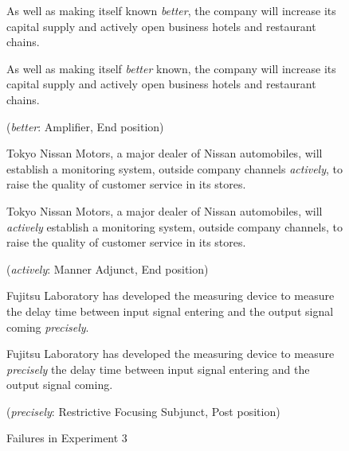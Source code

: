 \begin{singlespace}
\begin{figure}[htbp]
    \leavevmode
\begin{description}
 \small
 \item[This Method\ \ \ \ \ \ \ ]
As well as making itself known {\em better}, the company will increase 
its capital supply and actively open business hotels and restaurant chains. 
 \item[Human Translation]
As well as making itself {\em better} known, the company will increase 
its capital supply and actively open business hotels and restaurant chains. 
 \item[] ({\em better}: Amplifier, End position) 
\vspace*{2mm}
\end{description} 
\begin{description}
 \small
 \item[This Method\ \ \ \ \ \ \ ]
Tokyo Nissan Motors, a major dealer of Nissan automobiles, will  
establish a monitoring system, outside company channels {\em actively}, 
to raise the quality of customer service in its stores. 
 \item[Human Translation]
Tokyo Nissan Motors, a major dealer of Nissan automobiles, will 
{\em actively} establish a monitoring system, outside company channels, 
to raise the quality of customer service in its stores. 
 \item [] ({\em actively}:  Manner Adjunct, End position)
\vspace*{1mm}
\end{description} 
\begin{description}
 \small
 \item [This Method\ \ \ \ \ \ \ ]
Fujitsu Laboratory has developed the measuring device to measure 
the delay time between input signal entering and 
the output signal coming {\em precisely}. 
 \item [Human Translation]
Fujitsu Laboratory has developed the measuring device to measure 
{\em precisely} the delay time between input signal entering and 
the output signal coming.
 \item [] ({\em precisely}: Restrictive Focusing Subjunct, Post position)
\vspace*{2mm}
\end{description} 
    \caption{Failures in Experiment 3}
    \label{fig:Failures-Ex3}
\end{figure}
\end{singlespace}

